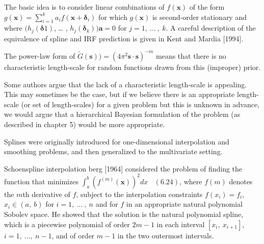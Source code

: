 \documentclass[
  ignorenonframetext,
]{beamer}
\begin{document}
\begin{frame}{}
\protect\hypertarget{section-19}{}
The basic idea is to consider linear combinations of \(f(\pmb x)\) of
the form \(g(\pmb x) = \sum^k_{i=1} a_i f(\pmb x + \pmb \delta_i)\) for
which \(g(\pmb x)\) is second-order stationary and where
\((h_j(\pmb \delta 1)\), \ldots{} , \(h_j(\pmb \delta_k))\pmb a = 0\)
for \(j = 1,\ ...\ ,\ k\). A careful description of the equivalence of
spline and IRF prediction is given in Kent and Mardia {[}1994{]}.

The power-law form of
\(\tilde G (\pmb s)) = (4\pi^2 \pmb s \cdot \pmb s)^{−m}\) means that
there is no characteristic length-scale for random functions drawn from
this (improper) prior.

Some authors argue that the lack of a characteristic length-scale is
appealing. This may sometimes be the case, but if we believe there is an
appropriate length-scale (or set of length-scales) for a given problem
but this is unknown in advance, we would argue that a hierarchical
Bayesian formulation of the problem (as described in chapter 5) would be
more appropriate.
\end{frame}

\begin{frame}{}
\protect\hypertarget{section-20}{}
Splines were originally introduced for one-dimensional interpolation and
smoothing problems, and then generalized to the multivariate setting.

Schoenspline interpolation berg {[}1964{]} considered the problem of
finding the function that minimizes
\(\int_a^b (f^{(m)} (\pmb x))^2 dx \ \ \ \ (6.24)\), where \(f(m)\)
denotes the \(m\)th derivative of \(f\), subject to the interpolation
constraints \(f(x_i) = f_i\), \(x_i \in (a,\ b)\) for
\(i = 1,\ ...\ ,\ n\) and for \(f\) in an appropriate natural polynomial
Sobolev space. He showed that the solution is the natural polynomial
spline, which is a piecewise polynomial of order \(2m − 1\) in each
interval \([x_i,\ x_{i+1}]\), \(i = 1,\ ... ,\ n − 1\), and of order
\(m − 1\) in the two outermost intervals.
\end{frame}
\end{document}
